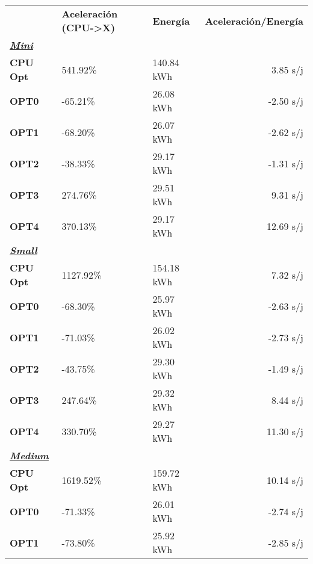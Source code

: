 \begin{table}[H]
    \centering
    \begin{tabular}{lllr}
    \rowcolor[HTML]{DAE8FC} \ & \textbf{Aceleración (CPU->X)} & \textbf{	Energía} & \textbf{	Aceleración/Energía} \\
    \cellcolor[HTML]{DAE8FC} \textbf{\textbf{{\emph{{\underline{{Mini}}}}}}} & &	&	 \\
    \rowcolor[HTML]{EFEFEF} \cellcolor[HTML]{DAE8FC} \textbf{CPU Opt} &541.92\%  &	140.84 kWh  &	3.85 s/j \\
    \cellcolor[HTML]{DAE8FC} \textbf{OPT0} & -65.21\%  &	26.08 kWh  &	-2.50 s/j \\
    \rowcolor[HTML]{EFEFEF} \cellcolor[HTML]{DAE8FC} \textbf{OPT1} &-68.20\%  &	26.07 kWh  &	-2.62 s/j \\
    \cellcolor[HTML]{DAE8FC} \textbf{OPT2} & -38.33\%  &	29.17 kWh  &	-1.31 s/j \\
    \rowcolor[HTML]{EFEFEF} \cellcolor[HTML]{DAE8FC} \textbf{OPT3} &274.76\%  &	29.51 kWh  &	9.31 s/j \\
    \cellcolor[HTML]{DAE8FC} \textbf{OPT4} & 370.13\%  &	29.17 kWh  &	12.69 s/j \\
    \rowcolor[HTML]{EFEFEF} \cellcolor[HTML]{DAE8FC} \textbf{\textbf{{\emph{{\underline{{Small}}}}}}} &&	&	 \\
    \cellcolor[HTML]{DAE8FC} \textbf{CPU Opt} & 1127.92\%  &	154.18 kWh  &	7.32 s/j \\
    \rowcolor[HTML]{EFEFEF} \cellcolor[HTML]{DAE8FC} \textbf{OPT0} &-68.30\%  &	25.97 kWh  &	-2.63 s/j \\
    \cellcolor[HTML]{DAE8FC} \textbf{OPT1} & -71.03\%  &	26.02 kWh  &	-2.73 s/j \\
    \rowcolor[HTML]{EFEFEF} \cellcolor[HTML]{DAE8FC} \textbf{OPT2} &-43.75\%  &	29.30 kWh  &	-1.49 s/j \\
    \cellcolor[HTML]{DAE8FC} \textbf{OPT3} & 247.64\%  &	29.32 kWh  &	8.44 s/j \\
    \rowcolor[HTML]{EFEFEF} \cellcolor[HTML]{DAE8FC} \textbf{OPT4} &330.70\%  &	29.27 kWh  &	11.30 s/j \\
    \cellcolor[HTML]{DAE8FC} \textbf{\textbf{{\emph{{\underline{{Medium}}}}}}} & &	&	 \\
    \rowcolor[HTML]{EFEFEF} \cellcolor[HTML]{DAE8FC} \textbf{CPU Opt} &1619.52\%  &	159.72 kWh  &	10.14 s/j \\
    \cellcolor[HTML]{DAE8FC} \textbf{OPT0} & -71.33\%  &	26.01 kWh  &	-2.74 s/j \\
    \rowcolor[HTML]{EFEFEF} \cellcolor[HTML]{DAE8FC} \textbf{OPT1} &-73.80\%  &	25.92 kWh  &	-2.85 s/j \\

\end{tabular}
\end{table}
